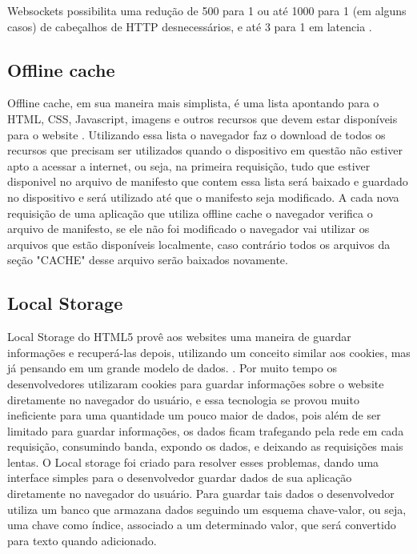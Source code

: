 Websockets possibilita uma redução de 500 para 1 ou até 1000 para 1
(em alguns casos) de cabeçalhos de HTTP desnecessários, e até 3 para 1
em latencia \cite{lubbers2010pro}.


\subsection{Offline cache}
Offline cache, em sua maneira mais simplista, é uma lista apontando
para o HTML, CSS, Javascript, imagens e outros recursos que devem
estar disponíveis para o website \cite{pilgrim2010html5}. Utilizando
essa lista o navegador faz o download de todos os recursos que
precisam ser utilizados quando o dispositivo em questão não estiver
apto a acessar a internet, ou seja, na primeira requisição, tudo que estiver
disponivel no arquivo de manifesto que contem essa lista será baixado
e guardado no dispositivo e será utilizado até que o manifesto seja
modificado.
A cada nova requisição de uma aplicação que utiliza offline cache o
navegador verifica o arquivo de manifesto, se ele não foi modificado
o navegador vai utilizar os arquivos que estão disponíveis localmente,
caso contrário todos os arquivos da seção "CACHE" desse arquivo serão baixados novamente.


\subsection{Local Storage}

Local Storage do HTML5 provê aos websites uma maneira de guardar
informações e recuperá-las depois, utilizando um conceito similar aos
cookies, mas já pensando em um grande modelo de dados.
\cite{pilgrim2010html5}.
Por muito tempo os desenvolvedores utilizaram cookies para guardar
informações sobre o website diretamente no navegador do usuário, e
essa tecnologia se provou muito ineficiente para uma quantidade um
pouco maior de dados, pois além de ser limitado para guardar informações,
os dados ficam trafegando pela rede em cada requisição, consumindo
banda, expondo os dados, e deixando as requisições mais lentas.
O Local storage foi criado para resolver esses problemas, dando uma
interface simples para o desenvolvedor guardar dados de sua
aplicação diretamente no navegador do usuário. Para guardar tais dados
o desenvolvedor utiliza um banco que armazana dados seguindo um
esquema chave-valor, ou seja, uma chave como índice, associado a um
determinado valor, que será convertido para texto quando adicionado.

